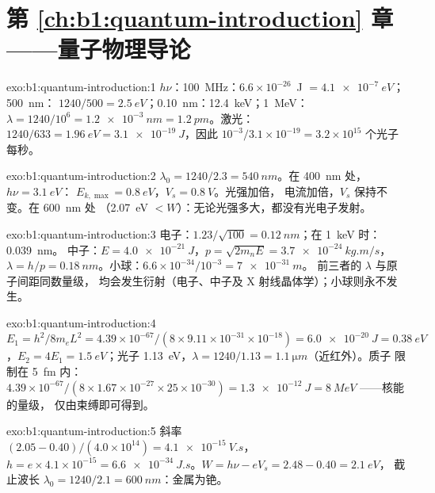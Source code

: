 \section*{第 \ref{ch:b1:quantum-introduction} 章——量子物理导论}

\begin{solution}{exo:b1:quantum-introduction:1}
$h\nu$：\qty{100}{MHz}：$6.6 \times 10^{-26}$~J $= \qty{4.1e-7}{eV}$；\qty{500}{nm}：
$1240/500 = \qty{2.5}{eV}$；\qty{0.10}{nm}：\qty{12.4}{keV}；\qty{1}{MeV}：$\lambda =
1240/10^6 = \qty{1.2e-3}{nm} = \qty{1.2}{pm}$。激光：$1240/633 = \qty{1.96}{eV} =
\qty{3.1e-19}{J}$，因此 $10^{-3}/3.1 \times 10^{-19} = 3.2 \times 10^{15}$ 个光子
每秒。
\end{solution}

\begin{solution}{exo:b1:quantum-introduction:2}
$\lambda_0 = 1240/2.3 = \qty{540}{nm}$。在 \qty{400}{nm} 处，$h\nu = \qty{3.1}{eV}$：
$E_{k,\max} = \qty{0.8}{eV}$，$V_s = \qty{0.8}{V}$。光强加倍，
电流加倍，$V_s$ 保持不变。在 \qty{600}{nm} 处
（\qty{2.07}{eV} $< W$）：无论光强多大，都没有光电子发射。
\end{solution}

\begin{solution}{exo:b1:quantum-introduction:3}
电子：$1.23/\sqrt{100} = \qty{0.12}{nm}$；在 \qty{1}{keV} 时：\qty{0.039}{nm}。
中子：$E = \qty{4.0e-21}{J}$，$p = \sqrt{2m_nE} = \qty{3.7e-24}{kg.m/s}$，
$\lambda = h/p = \qty{0.18}{nm}$。小球：$6.6 \times 10^{-34}/10^{-3} = \qty{7e-31}{m}$。
前三者的 $\lambda$ 与原子间距同数量级，
均会发生衍射（电子、中子及 X 射线晶体学）；小球则永不发生。
\end{solution}

\begin{solution}{exo:b1:quantum-introduction:4}
$E_1 = h^2/8m_eL^2 = 4.39 \times 10^{-67}/(8 \times 9.11 \times 10^{-31} \times 10^{-18}) =
\qty{6.0e-20}{J} = \qty{0.38}{eV}$，$E_2 = 4E_1 = \qty{1.5}{eV}$；光子
\qty{1.13}{eV}，$\lambda = 1240/1.13 = \qty{1.1}{\micro m}$（近红外）。质子
限制在 \qty{5}{fm} 内：$4.39 \times 10^{-67}/(8 \times 1.67 \times 10^{-27} \times 25 \times 10^{-30}) =
\qty{1.3e-12}{J} = \qty{8}{MeV}$ ——核能的量级，
仅由束缚即可得到。
\end{solution}

\begin{solution}{exo:b1:quantum-introduction:5}
斜率 $(2.05 - 0.40)/(4.0 \times 10^{14}) = \qty{4.1e-15}{V.s}$，$h = e \times 4.1 \times
10^{-15} = \qty{6.6e-34}{J.s}$。$W = h\nu - eV_s = 2.48 - 0.40 = \qty{2.1}{eV}$，
截止波长 $\lambda_0 = 1240/2.1 = \qty{600}{nm}$：金属为铯。
\end{solution}

